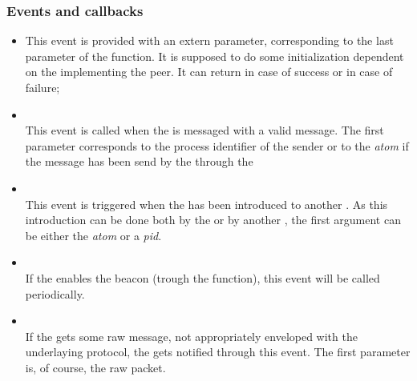     \subsubsection{Events and callbacks}
        \begin{itemize}
        \item {}
            This event is provided with an extern parameter,
            corresponding to the last parameter of the
             function.  It is supposed to
            do some initialization dependent on the  implementing the peer.  It can return
             in case of success or  in
            case of failure;

        \item {} \\
            This event is called when the  is
            messaged with a valid message. The first parameter corresponds
            to the process identifier of the sender or to the \emph{atom}
             if the message has been send by the
             through the 

        \item {} \\
            This event is triggered when the 
            has been introduced to another . As this
            introduction can be done both by the  or by
            another , the first argument can be either the
             \emph{atom} or a \emph{pid}.

        \item {} \\
            If the  enables the beacon (trough the
             function), this event
            will be called periodically.

        \item {} \\
             If the  gets some raw message, not
            appropriately enveloped with the underlaying protocol, the
             gets notified through this event. The first
            parameter is, of course, the raw packet.

        \end{itemize}

